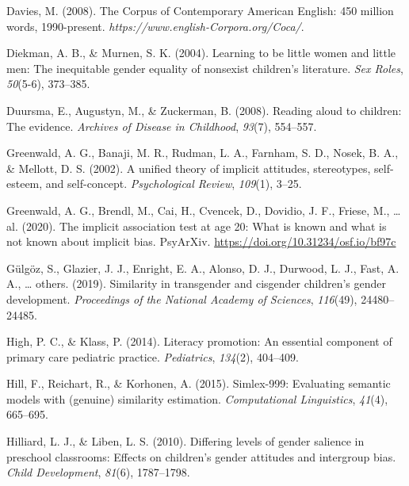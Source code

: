 \documentclass[
  english,
  ,man,floatsintext]{apa6}
\begin{document}
\leavevmode\hypertarget{ref-davies2008corpus}{}%
Davies, M. (2008). The Corpus of Contemporary American English: 450 million words, 1990-present. \emph{https://www.english-Corpora.org/Coca/}.

\leavevmode\hypertarget{ref-diekman2004learning}{}%
Diekman, A. B., \& Murnen, S. K. (2004). Learning to be little women and little men: The inequitable gender equality of nonsexist children's literature. \emph{Sex Roles}, \emph{50}(5-6), 373--385.

\leavevmode\hypertarget{ref-duursma2008reading}{}%
Duursma, E., Augustyn, M., \& Zuckerman, B. (2008). Reading aloud to children: The evidence. \emph{Archives of Disease in Childhood}, \emph{93}(7), 554--557.

\leavevmode\hypertarget{ref-greenwald2002unified}{}%
Greenwald, A. G., Banaji, M. R., Rudman, L. A., Farnham, S. D., Nosek, B. A., \& Mellott, D. S. (2002). A unified theory of implicit attitudes, stereotypes, self-esteem, and self-concept. \emph{Psychological Review}, \emph{109}(1), 3--25.

\leavevmode\hypertarget{ref-greenwald2020}{}%
Greenwald, A. G., Brendl, M., Cai, H., Cvencek, D., Dovidio, J. F., Friese, M., \ldots{} al. (2020). The implicit association test at age 20: What is known and what is not known about implicit bias. PsyArXiv. \url{https://doi.org/10.31234/osf.io/bf97c}

\leavevmode\hypertarget{ref-gulgoz2019similarity}{}%
Gülgöz, S., Glazier, J. J., Enright, E. A., Alonso, D. J., Durwood, L. J., Fast, A. A., \ldots{} others. (2019). Similarity in transgender and cisgender children's gender development. \emph{Proceedings of the National Academy of Sciences}, \emph{116}(49), 24480--24485.

\leavevmode\hypertarget{ref-high2014literacy}{}%
High, P. C., \& Klass, P. (2014). Literacy promotion: An essential component of primary care pediatric practice. \emph{Pediatrics}, \emph{134}(2), 404--409.

\leavevmode\hypertarget{ref-hill2015simlex}{}%
Hill, F., Reichart, R., \& Korhonen, A. (2015). Simlex-999: Evaluating semantic models with (genuine) similarity estimation. \emph{Computational Linguistics}, \emph{41}(4), 665--695.

\leavevmode\hypertarget{ref-hilliard2010differing}{}%
Hilliard, L. J., \& Liben, L. S. (2010). Differing levels of gender salience in preschool classrooms: Effects on children's gender attitudes and intergroup bias. \emph{Child Development}, \emph{81}(6), 1787--1798.
\end{document}

